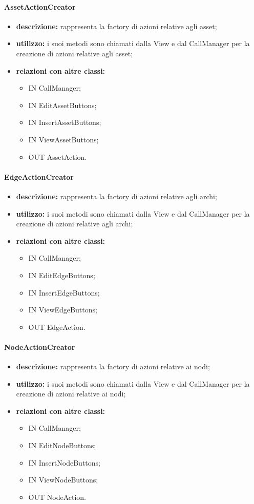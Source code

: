 \paragraph{AssetActionCreator}
\begin{itemize}
	\item \textbf{descrizione:} rappresenta la factory di azioni relative agli asset;
	\item \textbf{utilizzo:} i suoi metodi sono chiamati dalla View e dal CallManager per la creazione di azioni relative agli asset;
	\item \textbf{relazioni con altre classi:} 
	\begin{itemize}
		\item IN CallManager;
		\item IN EditAssetButtons;
		\item IN InsertAssetButtons;
		\item IN ViewAssetButtons;
		\item OUT AssetAction.
	\end{itemize}
\end{itemize}
\paragraph{EdgeActionCreator}
\begin{itemize}
	\item \textbf{descrizione:} rappresenta la factory di azioni relative agli archi;
	\item \textbf{utilizzo:} i suoi metodi sono chiamati dalla View e dal CallManager per la creazione di azioni relative agli archi;
	\item \textbf{relazioni con altre classi:} 
	\begin{itemize}
		\item IN CallManager;
		\item IN EditEdgeButtons;
		\item IN InsertEdgeButtons;
		\item IN ViewEdgeButtons;
		\item OUT EdgeAction.
	\end{itemize}
\end{itemize}
\paragraph{NodeActionCreator}
\begin{itemize}
	\item \textbf{descrizione:} rappresenta la factory di azioni relative ai nodi;
	\item \textbf{utilizzo:} i suoi metodi sono chiamati dalla View e dal CallManager per la creazione di azioni relative ai nodi;
	\item \textbf{relazioni con altre classi:} 
	\begin{itemize}
		\item IN CallManager;
		\item IN EditNodeButtons;
		\item IN InsertNodeButtons;
		\item IN ViewNodeButtons;
		\item OUT NodeAction.
	\end{itemize}
\end{itemize}
